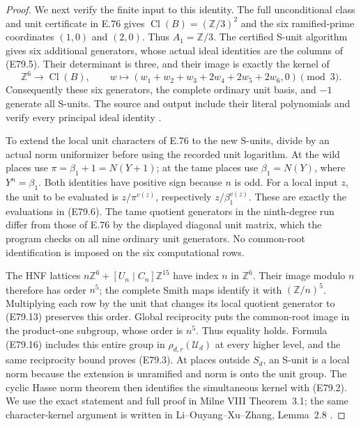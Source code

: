 \begin{proof}
We next verify the finite input to this identity. The full
unconditional class and unit certificate in E.76 gives
$\operatorname{Cl}(B)=(\mathbb Z/3)^2$ and the six
ramified-prime coordinates $(1,0)$ and $(2,0)$. Thus
$A_1=\mathbb Z/3$. The certified S-unit algorithm gives six
additional generators, whose actual ideal identities are
the columns of (E79.5). Their determinant is three, and their
image is exactly the kernel of
\[
 \mathbb Z^6\longrightarrow\operatorname{Cl}(B),\qquad
 w\longmapsto(w_1+w_2+w_3+2w_4+2w_5+2w_6,0)\pmod3.
 \tag{E79.17}
\]
Consequently these six generators, the complete ordinary
unit basis, and $-1$ generate all S-units. The source and
output include their literal polynomials and verify every
principal ideal identity \cite{E_PARICertifiedUnits}.

To extend the local unit characters of E.76 to the new
S-units, divide by an actual norm uniformizer before using
the recorded unit logarithm. At the wild places use
$\pi=\beta_1+1=N(Y+1)$; at the tame places use
$\beta_1=N(Y)$, where $Y^n=\beta_1$. Both identities have
positive sign because $n$ is odd. For a local input $z$,
the unit to be evaluated is $z/\pi^{v(z)}$, respectively
$z/\beta_1^{v(z)}$. These are exactly the evaluations in
(E79.6). The tame quotient generators in the ninth-degree
run differ from those of E.76 by the displayed diagonal
unit matrix, which the program checks on all nine ordinary
unit generators. No common-root identification is imposed
on the six computational rows.

The HNF lattices $n\mathbb Z^6+[U_n\mid C_n]\mathbb Z^{15}$
have index $n$ in $\mathbb Z^6$. Their image modulo $n$
therefore has order $n^5$; the complete Smith maps identify
it with $(\mathbb Z/n)^5$. Multiplying each row by the
unit that changes its local quotient generator to
(E79.13) preserves this order. Global reciprocity puts
the common-root image in the product-one subgroup, whose
order is $n^5$. Thus equality holds. Formula (E79.16)
includes this entire group in $\rho_{d,r}(\mathscr U_d)$
at every higher level, and the same reciprocity bound
proves (E79.3). At places outside $S_d$, an S-unit is a
local norm because the extension is unramified and norm
is onto the unit group. The cyclic Hasse norm theorem
then identifies the simultaneous kernel with (E79.2).
We use the exact statement and full proof in Milne VIII
Theorem~3.1; the same character-kernel argument is written
in Li--Ouyang--Xu--Zhang, Lemma~2.8
\cite{E_MilneCFT,E_LOXZKummer}.


\end{proof}
